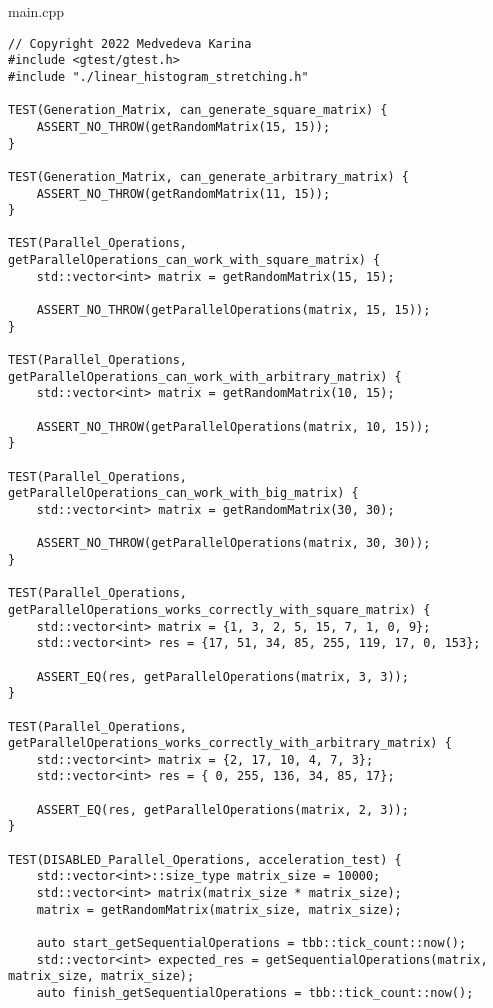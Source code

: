 \documentclass{report}
\begin{document}
\par main.cpp
\begin{lstlisting}
// Copyright 2022 Medvedeva Karina
#include <gtest/gtest.h>
#include "./linear_histogram_stretching.h"

TEST(Generation_Matrix, can_generate_square_matrix) {
    ASSERT_NO_THROW(getRandomMatrix(15, 15));
}

TEST(Generation_Matrix, can_generate_arbitrary_matrix) {
    ASSERT_NO_THROW(getRandomMatrix(11, 15));
}

TEST(Parallel_Operations, getParallelOperations_can_work_with_square_matrix) {
    std::vector<int> matrix = getRandomMatrix(15, 15);

    ASSERT_NO_THROW(getParallelOperations(matrix, 15, 15));
}

TEST(Parallel_Operations, getParallelOperations_can_work_with_arbitrary_matrix) {
    std::vector<int> matrix = getRandomMatrix(10, 15);

    ASSERT_NO_THROW(getParallelOperations(matrix, 10, 15));
}

TEST(Parallel_Operations, getParallelOperations_can_work_with_big_matrix) {
    std::vector<int> matrix = getRandomMatrix(30, 30);

    ASSERT_NO_THROW(getParallelOperations(matrix, 30, 30));
}

TEST(Parallel_Operations, getParallelOperations_works_correctly_with_square_matrix) {
    std::vector<int> matrix = {1, 3, 2, 5, 15, 7, 1, 0, 9};
    std::vector<int> res = {17, 51, 34, 85, 255, 119, 17, 0, 153};

    ASSERT_EQ(res, getParallelOperations(matrix, 3, 3));
}

TEST(Parallel_Operations, getParallelOperations_works_correctly_with_arbitrary_matrix) {
    std::vector<int> matrix = {2, 17, 10, 4, 7, 3};
    std::vector<int> res = { 0, 255, 136, 34, 85, 17};

    ASSERT_EQ(res, getParallelOperations(matrix, 2, 3));
}

TEST(DISABLED_Parallel_Operations, acceleration_test) {
    std::vector<int>::size_type matrix_size = 10000;
    std::vector<int> matrix(matrix_size * matrix_size);
    matrix = getRandomMatrix(matrix_size, matrix_size);

    auto start_getSequentialOperations = tbb::tick_count::now();
    std::vector<int> expected_res = getSequentialOperations(matrix, matrix_size, matrix_size);
    auto finish_getSequentialOperations = tbb::tick_count::now();


\end{lstlisting}
\end{document}
